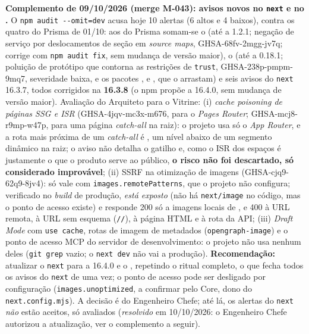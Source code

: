 \textbf{Complemento de 09/10/2026 (merge M-043): avisos novos no \texttt{next} e no .} O \texttt{npm audit -{}-omit=dev} acusa hoje 10 alertas (6 altos e 4 baixos), contra os quatro do Prisma de 01/10: aos do Prisma somam-se o  (até a 1.2.1; negação de serviço por deslocamentos de seção em \emph{source maps}, GHSA-68fv-2mgg-jv7q; corrige com \texttt{npm audit fix}, sem mudança de versão maior), o  (até a 0.18.1; poluição de protótipo que contorna as restrições de \texttt{trust}, GHSA-238p-pmpm-9mq7, severidade baixa, e os pacotes ,  e , que o arrastam) e seis avisos do \texttt{next} 16.3.7, todos corrigidos na \textbf{16.3.8} (o npm propõe a 16.4.0, sem mudança de versão maior). Avaliação do Arquiteto para o Vitrine: (i) \emph{cache poisoning de páginas SSG e ISR} (GHSA-4jqv-mc3x-m676, para o \emph{Pages Router}; GHSA-mcj8-r9mp-w47p, para uma página \emph{catch-all} na raiz): o projeto usa só o \emph{App Router}, e a rota mais próxima de um \emph{catch-all} é \arq{/[handle]/[...slug]}, um nível abaixo de um segmento dinâmico na raiz; o aviso não detalha o gatilho e, como o ISR dos espaços é justamente o que o produto serve ao público, \textbf{o risco não foi descartado, só considerado improvável}; (ii) SSRF na otimização de imagens (GHSA-cjq9-62q9-8jv4): só vale com \texttt{images.remotePatterns}, que o projeto não configura; verificado no \emph{build} de produção,  \emph{está exposto} (não há \texttt{next/image} no código, mas o ponto de acesso existe) e responde 200 só a imagens locais de , e 400 à URL remota, à URL sem esquema (\texttt{//}), à página HTML e à rota da API; (iii) \emph{Draft Mode} com \texttt{use cache}, rotas de imagem de metadados (\texttt{opengraph-image}) e o ponto de acesso MCP do servidor de desenvolvimento: o projeto não usa nenhum deles (\texttt{git grep} vazio; o \texttt{next dev} não vai a produção). \textbf{Recomendação:} atualizar o \texttt{next} para a 16.4.0 e o , repetindo o ritual completo, o que fecha todos os avisos do \texttt{next} de uma vez; o ponto de acesso  pode ser desligado por configuração (\texttt{images.unoptimized}, a confirmar pelo Core, dono do \texttt{next.config.mjs}). A decisão é do Engenheiro Chefe; até lá, os alertas do \texttt{next} \emph{não} estão aceitos, só avaliados (\emph{resolvido} em 10/10/2026: o Engenheiro Chefe autorizou a atualização, ver o complemento a seguir).

